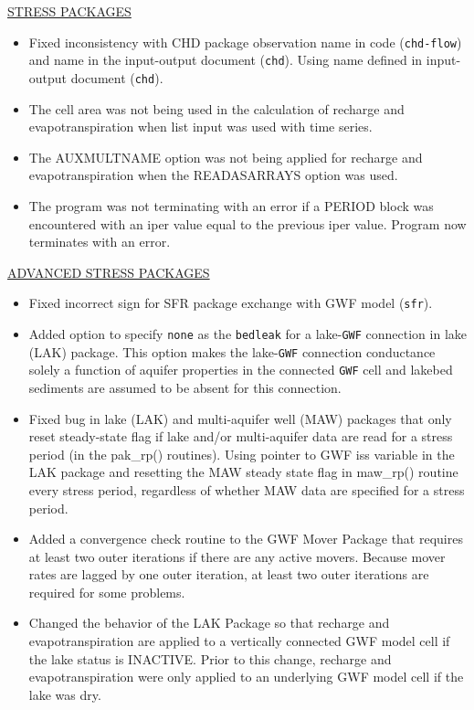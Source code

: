 \documentclass[11pt,twoside,twocolumn]{usgsreport}
\begin{document}
\begin{itemize}
\underline{STRESS PACKAGES}
\begin{itemize}
\item Fixed inconsistency with CHD package observation name in code (\texttt{chd-flow}) and name in the input-output document (\texttt{chd}). Using name defined in input-output document (\texttt{chd}).
\item The cell area was not being used in the calculation of recharge and evapotranspiration when list input was used with time series.
\item The AUXMULTNAME option was not being applied for recharge and evapotranspiration when the READASARRAYS option was used.
\item The program was not terminating with an error if a PERIOD block was encountered with an iper value equal to the previous iper value.  Program now terminates with an error.
\end{itemize}

\underline{ADVANCED STRESS PACKAGES}
\begin{itemize}
\item Fixed incorrect sign for SFR package exchange with GWF model (\texttt{sfr}).
\item Added option to specify \texttt{none} as the \texttt{bedleak} for a lake-\texttt{GWF} connection in lake (LAK) package. This option makes the lake-\texttt{GWF} connection conductance solely a function of aquifer properties in the connected \texttt{GWF} cell and lakebed sediments are assumed to be absent for this connection.
\item Fixed bug in lake (LAK) and multi-aquifer well (MAW) packages that only reset steady-state flag if lake and/or multi-aquifer data are read for a stress period (in the pak\_rp() routines). Using pointer to GWF iss variable in the LAK package and resetting the MAW steady state flag in maw\_rp() routine every stress period, regardless of whether MAW data are specified for a stress period.
\item Added a convergence check routine to the GWF Mover Package that requires at least two outer iterations if there are any active movers.  Because mover rates are lagged by one outer iteration, at least two outer iterations are required for some problems.
\item Changed the behavior of the LAK Package so that recharge and evapotranspiration are applied to a vertically connected GWF model cell if the lake status is INACTIVE.  Prior to this change, recharge and evapotranspiration were only applied to an underlying GWF model cell if the lake was dry.
\end{itemize}


\end{itemize}
\end{document}
